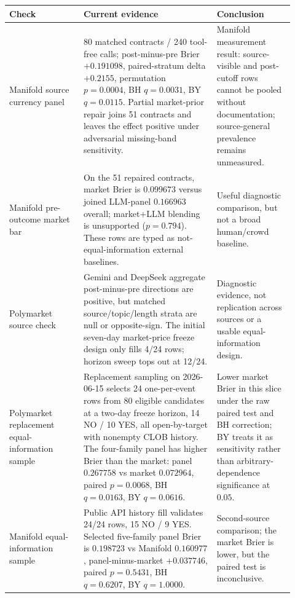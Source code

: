 \documentclass[11pt]{article}
\begin{document}
\begin{table}[htbp]
\centering
\begingroup
\scriptsize
\setlength{\tabcolsep}{2pt}
\renewcommand{\arraystretch}{0.9}
\begin{tabular}{L{0.24\linewidth} L{0.43\linewidth} L{0.25\linewidth}}
\toprule
Check & Current evidence & Conclusion \\
\midrule
Manifold source currency panel & 80 matched contracts / 240 tool-free calls; post-minus-pre Brier $+0.191098$, paired-stratum delta $+0.2155$, permutation $p=0.0004$, BH $q=0.0031$, BY $q=0.0115$. Partial market-prior repair joins 51 contracts and leaves the effect positive under adversarial missing-band sensitivity. & Manifold measurement result: source-visible and post-cutoff rows cannot be pooled without documentation; source-general prevalence remains unmeasured. \\
Manifold pre-outcome market bar & On the 51 repaired contracts, market Brier is $0.099673$ versus joined LLM-panel $0.166963$ overall; market+LLM blending is unsupported ($p=0.794$). These rows are typed as not-equal-information external baselines. & Useful diagnostic comparison, but not a broad human/crowd baseline. \\
Polymarket source check & Gemini and DeepSeek aggregate post-minus-pre directions are positive, but matched source/topic/length strata are null or opposite-sign. The initial seven-day market-price freeze design only fills 4/24 rows; horizon sweep tops out at 12/24. & Diagnostic evidence, not replication across sources or a usable equal-information design. \\
Polymarket replacement equal-information sample & Replacement sampling on 2026-06-15 selects 24 one-per-event rows from 80 eligible candidates at a two-day freeze horizon, 14 NO / 10 YES, all open-by-target with nonempty CLOB history. The four-family panel has higher Brier than the market: panel $0.267758$ vs market $0.072964$, paired $p=0.0068$, BH $q=0.0163$, BY $q=0.0616$. & Lower market Brier in this slice under the raw paired test and BH correction; BY treats it as sensitivity rather than arbitrary-dependence significance at \(0.05\). \\
Manifold equal-information sample & Public API history fill validates 24/24 rows, 15 NO / 9 YES. Selected five-family panel Brier is $0.198723$ vs Manifold $0.160977$, panel-minus-market $+0.037746$, paired $p=0.5431$, BH $q=0.6207$, BY $q=1.0000$. & Second-source comparison; the market Brier is lower, but the paired test is inconclusive. \\

\end{tabular}
\end{table}
\end{document}
